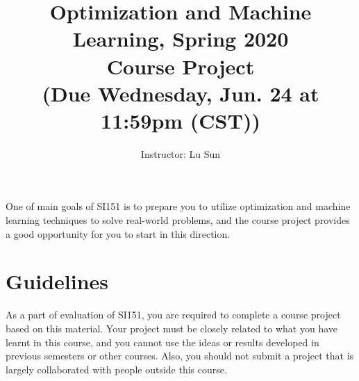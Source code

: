 \documentclass[10pt]{article}
\begin{document}
\title{Optimization and Machine Learning, Spring 2020 \\
	Course Project\\
	\small (Due Wednesday, Jun. 24 at 11:59pm (CST))}
\author{Instructor: Lu Sun}
\maketitle


One of main goals of SI151 is to prepare you to utilize optimization and machine learning techniques to solve real-world problems,
and the course project provides a good opportunity for you to start in this direction.


\section{Guidelines}
As a part of evaluation of SI151, you are required to complete a course project based on this material.
Your project must be closely related to what you have learnt in this course,
and you cannot use the ideas or results developed in previous semesters or other courses.
Also, you should not submit a project that is largely collaborated with people outside this course.
\end{document}
